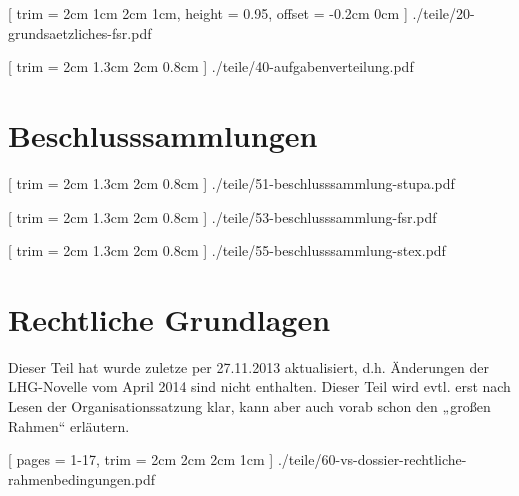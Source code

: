 \documentclass[
	10pt,
	a5paper,
	twoside
	]
	{book}
\begin{document}
\clearpage



	[
		trim = 2cm 1cm 2cm 1cm,
		height = 0.95\paperheight,
		offset = -0.2cm 0cm
	]
	{./teile/20-grundsaetzliches-fsr.pdf}





	[
		trim = 2cm 1.3cm 2cm 0.8cm
	]
	{./teile/40-aufgabenverteilung.pdf}


\chapter{Beschlusssammlungen}


\clearpage


%
%


	[
		trim = 2cm 1.3cm 2cm 0.8cm
	]
	{./teile/51-beschlusssammlung-stupa.pdf}


[
trim = 2cm 1.3cm 2cm 0.8cm
]
{./teile/53-beschlusssammlung-fsr.pdf}


	[
		trim = 2cm 1.3cm 2cm 0.8cm
	]
	{./teile/55-beschlusssammlung-stex.pdf}


\chapter{Rechtliche Grundlagen}

Dieser Teil hat wurde zuletze per 27.11.2013 aktualisiert, d.h. Änderungen der LHG-Novelle vom April 2014 sind nicht enthalten. Dieser Teil wird evtl. erst nach Lesen der Organisationssatzung klar, kann aber auch vorab schon den „großen Rahmen“ erläutern.

\clearpage


	[
		pages = 1-17,
		trim = 2cm 2cm 2cm 1cm
	]
	{./teile/60-vs-dossier-rechtliche-rahmenbedingungen.pdf}
\end{document}
